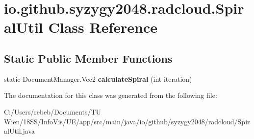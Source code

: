 \hypertarget{classio_1_1github_1_1syzygy2048_1_1radcloud_1_1_spiral_util}{}\section{io.\+github.\+syzygy2048.\+radcloud.\+Spiral\+Util Class Reference}
\label{classio_1_1github_1_1syzygy2048_1_1radcloud_1_1_spiral_util}
\subsection*{Static Public Member Functions}
\begin{DoxyCompactItemize}
\item 
\mbox{\label{classio_1_1github_1_1syzygy2048_1_1radcloud_1_1_spiral_util_a3309956a702151be9211ffd41e6313af}} 
static Document\+Manager.\+Vec2 {\bfseries calculate\+Spiral} (int iteration)
\end{DoxyCompactItemize}


The documentation for this class was generated from the following file\+:\begin{DoxyCompactItemize}
\item 
C\+:/\+Users/rebeb/\+Documents/\+T\+U Wien/18\+S\+S/\+Info\+Vis/\+U\+E/app/src/main/java/io/github/syzygy2048/radcloud/Spiral\+Util.\+java\end{DoxyCompactItemize}
